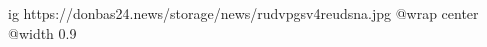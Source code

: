  
 
 
 
 

\ifcmt
  ig https://donbas24.news/storage/news/rudvpgsv4reudsna.jpg
  @wrap center
  @width 0.9
\fi
